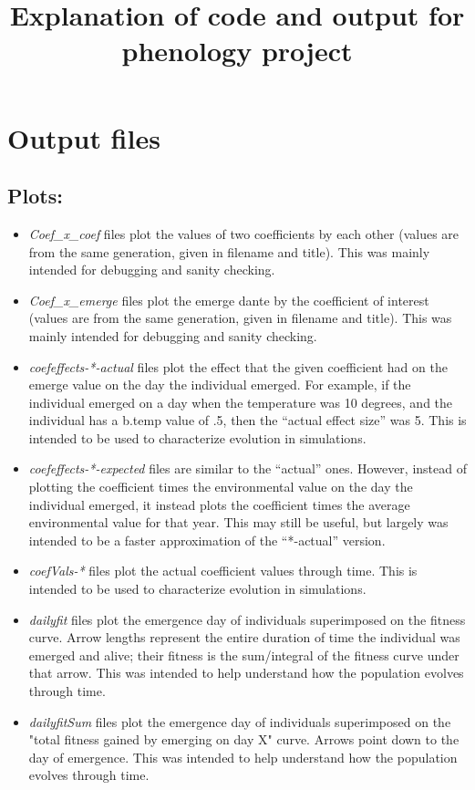 \documentclass[11pt,a4paper]{article}
\title{Explanation of code and output for phenology project}
\begin{document}
\maketitle
\section{Output files}
\subsection{Plots:}
\begin{itemize}
\item \textit{Coef\_x\_coef} files plot the values of two coefficients by each other (values are from the same generation, given in filename and title). This was mainly intended for debugging and sanity checking.
\item \textit{Coef\_x\_emerge} files plot the emerge dante by the coefficient of interest (values are from the same generation, given in filename and title). This was mainly intended for debugging and sanity checking.
\item \textit{coefeffects-*-actual} files plot the effect that the given coefficient had on the emerge value on the day the individual emerged. For example, if the individual emerged on a day when the temperature was 10 degrees, and the individual has a b.temp value of .5, then the ``actual effect size'' was 5. This is intended to be used to characterize evolution in simulations.
\item \textit{coefeffects-*-expected} files are similar to the ``actual'' ones. However, instead of plotting the coefficient times the environmental value on the day the individual emerged, it instead plots the coefficient times the average environmental value for that year. This may still be useful, but largely was intended to be a faster approximation of the ``*-actual'' version.
\item \textit{coefVals-*} files plot the actual coefficient values through time. This is intended to be used to characterize evolution in simulations.
\item \textit{dailyfit} files plot the emergence day of individuals superimposed on the fitness curve. Arrow lengths represent the entire duration of time the individual was emerged and alive; their fitness is the sum/integral of the fitness curve under that arrow. This was intended to help understand how the population evolves through time.
\item \textit{dailyfitSum} files plot the emergence day of individuals superimposed on the "total fitness gained by emerging on day X" curve. Arrows point down to the day of emergence. This was intended to help understand how the population evolves through time.

\end{itemize}
\end{document}
